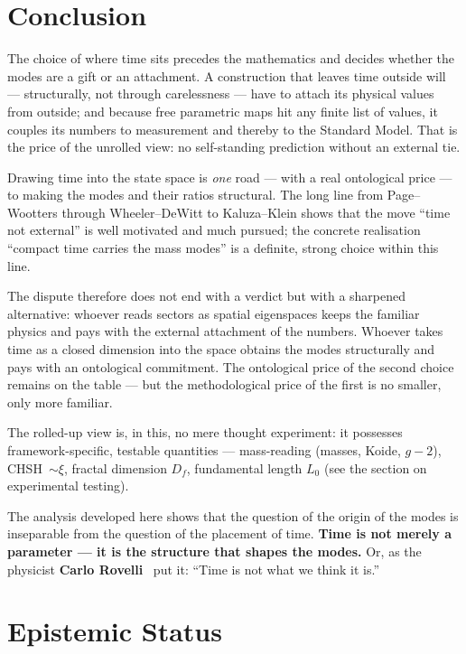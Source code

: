 \documentclass[11pt,a4paper]{article}
\begin{document}
\section{Conclusion}

The choice of where time sits precedes the mathematics and decides whether the modes are a gift or an attachment. A construction that leaves time outside will --- structurally, not through carelessness --- have to attach its physical values from outside; and because free parametric maps hit any finite list of values, it couples its numbers to measurement and thereby to the Standard Model. That is the price of the unrolled view: no self-standing prediction without an external tie.

Drawing time into the state space is \emph{one} road --- with a real ontological price --- to making the modes and their ratios structural. The long line from Page--Wootters through Wheeler--DeWitt to Kaluza--Klein shows that the move ``time not external'' is well motivated and much pursued; the concrete realisation ``compact time carries the mass modes'' is a definite, strong choice within this line.

The dispute therefore does not end with a verdict but with a sharpened alternative: whoever reads sectors as spatial eigenspaces keeps the familiar physics and pays with the external attachment of the numbers. Whoever takes time as a closed dimension into the space obtains the modes structurally and pays with an ontological commitment. The ontological price of the second choice remains on the table --- but the methodological price of the first is no smaller, only more familiar.

The rolled-up view is, in this, no mere thought experiment: it possesses framework-specific, testable quantities --- mass-reading (masses, Koide, $g-2$), CHSH~$\sim\xi$, fractal dimension $D_f$, fundamental length $L_0$ (see the section on experimental testing).

The analysis developed here shows that the question of the origin of the modes is inseparable from the question of the placement of time. \textbf{Time is not merely a parameter --- it is the structure that shapes the modes.} Or, as the physicist \textbf{Carlo Rovelli}~\cite{Rovelli2009} put it: ``Time is not what we think it is.''


\section{Epistemic Status}
\end{document}
